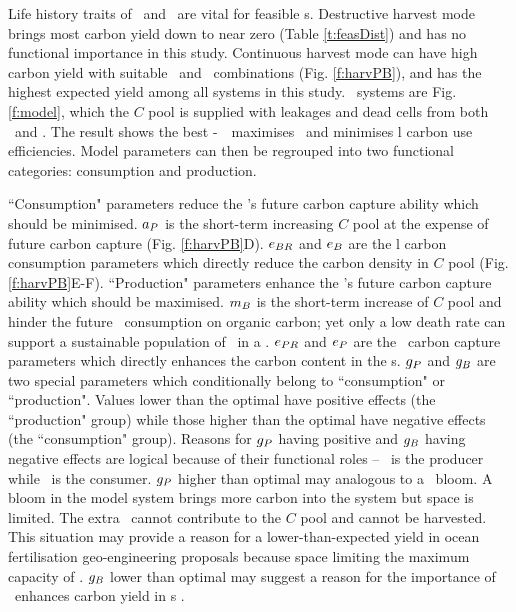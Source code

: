 \documentclass[../thesis.tex]{subfiles} %
\begin{document}
Life history traits of \phy\ and \bac\ are vital for feasible \pbs s.  Destructive harvest mode brings most carbon yield down to near zero (Table \ref{t:feasDist}) and has no functional importance in this study.  Continuous harvest mode can have high carbon yield with suitable \phy\ and \bac\ combinations (Fig. \ref{f:harvPB}), and has the highest expected yield among all systems in this study.  \PBH\ systems are Fig. \ref{f:model}, which the $C$ pool is supplied with leakages and dead cells from both \phy\ and \bac.  The result shows the best \phy-\bac\ \pbs\ maximises \phy\ and minimises \bac l carbon use efficiencies.  Model parameters can then be regrouped into two functional categories: consumption and production.

``Consumption" parameters reduce the \pbs's future carbon capture ability which should be minimised.  $a_P$ is the short-term increasing $C$ pool at the expense of future carbon capture (Fig. \ref{f:harvPB}D).  $e_{BR}$ and $e_B$ are the \bac l carbon consumption parameters which directly reduce the carbon density in $C$ pool (Fig. \ref{f:harvPB}E-F).  ``Production" parameters enhance the \pbs's future carbon capture ability which should be maximised.  $m_B$ is the short-term increase of $C$ pool and hinder the future \bac\ consumption on organic carbon; yet only a low death rate can support a sustainable population of \bac\ in a \pbs. $e_{PR}$ and $e_P$ are the \phy\ carbon capture parameters which directly enhances the carbon content in the \pbs s.  $g_P$ and $g_B$ are two special parameters which conditionally belong to ``consumption" or ``production".  Values lower than the optimal have positive effects (the ``production" group) while those higher than the optimal have negative effects (the ``consumption" group).  Reasons for $g_P$ having positive and $g_B$ having negative effects are logical because of their functional roles -- \phy\ is the producer while \bac\ is the consumer.  $g_P$ higher than optimal may analogous to a \phy\ bloom.  A bloom in the model system brings more carbon into the system but space is limited.  The extra \phy\ cannot contribute to the $C$ pool and cannot be harvested.  This situation may provide a reason for a lower-than-expected yield in ocean fertilisation geo-engineering proposals \autocite{boyd2008implications,gnanadesikan2008export,oschlies2010side} because space limiting the maximum capacity of \phy.  $g_B$ lower than optimal may suggest a reason for the importance of \bac\ enhances carbon yield in \pbs s \autocite{fuentes2016impact,santos2014microalgal}.
\end{document}
